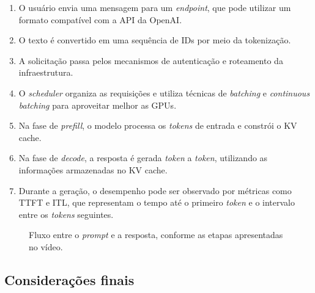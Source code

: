\documentclass[12pt, a4paper]{article}
\begin{document}
\begin{enumerate}[leftmargin=2em]
  \item O usuário envia uma mensagem para um \textit{endpoint}, que pode utilizar um formato compatível com a API da OpenAI.
  \item O texto é convertido em uma sequência de IDs por meio da tokenização.
  \item A solicitação passa pelos mecanismos de autenticação e roteamento da infraestrutura.
  \item O \textit{scheduler} organiza as requisições e utiliza técnicas de \textit{batching} e \textit{continuous batching} para aproveitar melhor as GPUs.
  \item Na fase de \textit{prefill}, o modelo processa os \textit{tokens} de entrada e constrói o KV cache.
  \item Na fase de \textit{decode}, a resposta é gerada \textit{token} a \textit{token}, utilizando as informações armazenadas no KV cache.
  \item Durante a geração, o desempenho pode ser observado por métricas como TTFT e ITL, que representam o tempo até o primeiro \textit{token} e o intervalo entre os \textit{tokens} seguintes.
\end{enumerate}

\begin{figure}[H]
  \centering
  \caption{Fluxo entre o \textit{prompt} e a resposta, conforme as etapas apresentadas no vídeo.}
  \label{fig:fluxo_inferencia}
\end{figure}

\subsection{Considerações finais}
\end{document}

